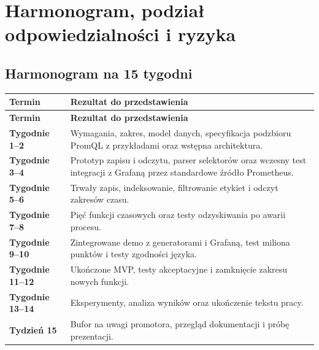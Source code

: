 \documentclass[12pt,a4paper]{article}
\begin{document}
\section{Harmonogram, podział odpowiedzialności i ryzyka}

\subsection{Harmonogram na 15 tygodni}

\begingroup
\small
\begin{longtable}{>{\raggedright\arraybackslash}p{}>{\raggedright\arraybackslash}p{}}
    \hline
    \textbf{Termin}         & \textbf{Rezultat do przedstawienia}                                                                                      \\
    \hline
    \endfirsthead
    \textbf{Termin}         & \textbf{Rezultat do przedstawienia}                                                                                      \\
    \hline
    \endhead
    \textbf{Tygodnie 1–2}   & Wymagania, zakres, model danych, specyfikacja podzbioru PromQL z przykładami oraz wstępna architektura.                  \\
    \hline
    \textbf{Tygodnie 3–4}   & Prototyp zapisu i odczytu, parser selektorów oraz wczesny test integracji z Grafaną przez standardowe źródło Prometheus. \\
    \hline
    \textbf{Tygodnie 5–6}   & Trwały zapis, indeksowanie, filtrowanie etykiet i odczyt zakresów czasu.                                                 \\
    \hline
    \textbf{Tygodnie 7–8}   & Pięć funkcji czasowych oraz testy odzyskiwania po awarii procesu.                                                        \\
    \hline
    \textbf{Tygodnie 9–10}  & Zintegrowane demo z generatorami i Grafaną, test miliona punktów i testy zgodności języka.                               \\
    \hline
    \textbf{Tygodnie 11–12} & Ukończone MVP, testy akceptacyjne i zamknięcie zakresu nowych funkcji.                                                   \\
    \hline
    \textbf{Tygodnie 13–14} & Eksperymenty, analiza wyników oraz ukończenie tekstu pracy.                                                              \\
    \hline
    \textbf{Tydzień 15}     & Bufor na uwagi promotora, przegląd dokumentacji i próbę prezentacji.                                                     \\
    \hline
\end{longtable}
\endgroup
\end{document}
